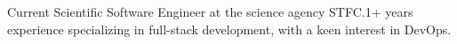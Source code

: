 
\begin{cvparagraph}

    Current Scientific Software Engineer at the science agency STFC.\@ 1+ years experience specializing in full-stack development, with a keen interest in DevOps.
\end{cvparagraph}
